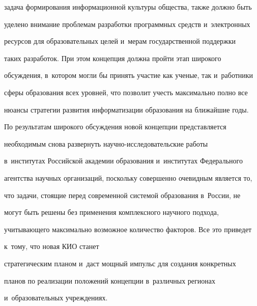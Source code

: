 задача формирования информационной культуры общества, также должно быть


уделено внимание проблемам разработки программных средств и~электронных


ресурсов для образовательных целей и~мерам государственной поддержки


таких разработок. При этом концепция должна пройти этап широкого


обсуждения, в~котором могли бы принять участие как ученые, так и~работники


сферы образования всех уровней, что позволит учесть максимально полно все


нюансы стратегии развития информатизации образования на ближайшие годы.


По результатам широкого обсуждения новой концепции представляется


необходимым снова развернуть на\-уч\-но-ис\-сле\-до\-ва\-тель\-ские работы


в~институтах Российской академии образования и~институтах Федерального


агентства научных организаций, поскольку совершенно очевидным является то,


что задачи, стоящие перед современной системой образования в~России, не


могут быть решены без применения комплексного научного подхода,


учитывающего максимально возможное количество факторов. Все это приведет


к~тому, что новая КИО станет


стратегическим планом и~даст мощный импульс для создания конкретных


планов по реализации положений концепции в~различных регионах


и~образовательных учрежде\-ниях.


{





}





